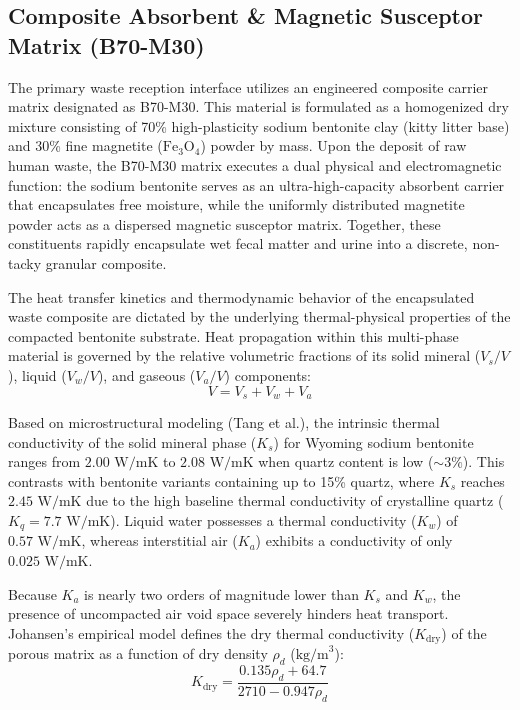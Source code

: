 \documentclass[10pt,twocolumn,a4paper]{article}
\begin{document}
\subsection{Composite Absorbent \& Magnetic Susceptor Matrix (B70-M30)}

The primary waste reception interface utilizes an engineered composite carrier matrix designated as B70-M30. This material is formulated as a homogenized dry mixture consisting of 70\% high-plasticity sodium bentonite clay (kitty litter base) and 30\% fine magnetite ($\text{Fe}_3\text{O}_4$) powder by mass. Upon the deposit of raw human waste, the B70-M30 matrix executes a dual physical and electromagnetic function: the sodium bentonite serves as an ultra-high-capacity absorbent carrier that encapsulates free moisture, while the uniformly distributed magnetite powder acts as a dispersed magnetic susceptor matrix. Together, these constituents rapidly encapsulate wet fecal matter and urine into a discrete, non-tacky granular composite.

The heat transfer kinetics and thermodynamic behavior of the encapsulated waste composite are dictated by the underlying thermal-physical properties of the compacted bentonite substrate. Heat propagation within this multi-phase material is governed by the relative volumetric fractions of its solid mineral ($V_s/V$), liquid ($V_w/V$), and gaseous ($V_a/V$) components:
\begin{equation}
V = V_s + V_w + V_a
\end{equation}

Based on microstructural modeling (Tang et al.), the intrinsic thermal conductivity of the solid mineral phase ($K_s$) for Wyoming sodium bentonite ranges from $2.00\text{ W/mK}$ to $2.08\text{ W/mK}$ when quartz content is low ($\sim 3\%$). This contrasts with bentonite variants containing up to 15\% quartz, where $K_s$ reaches $2.45\text{ W/mK}$ due to the high baseline thermal conductivity of crystalline quartz ($K_q = 7.7\text{ W/mK}$). Liquid water possesses a thermal conductivity ($K_w$) of $0.57\text{ W/mK}$, whereas interstitial air ($K_a$) exhibits a conductivity of only $0.025\text{ W/mK}$.

Because $K_a$ is nearly two orders of magnitude lower than $K_s$ and $K_w$, the presence of uncompacted air void space severely hinders heat transport. Johansen’s empirical model defines the dry thermal conductivity ($K_{\text{dry}}$) of the porous matrix as a function of dry density $\rho_d$ ($\text{kg/m}^3$):
\begin{equation}
K_{\text{dry}} = \frac{0.135 \rho_d + 64.7}{2710 - 0.947 \rho_d}
\end{equation}
\end{document}

